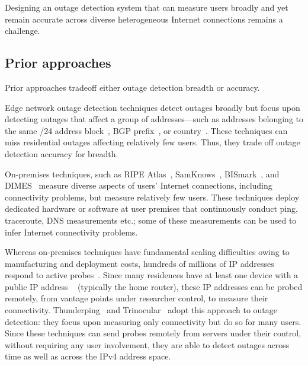Designing an outage detection system that can measure users
broadly and yet remain accurate across diverse heterogeneous
Internet connections remains a challenge.

\subsection{Prior approaches}

Prior approaches tradeoff either outage detection breadth or
accuracy. 

Edge network outage detection techniques detect outages broadly but
focus upon detecting outages that affect a group of addresses---such as
addresses belonging to the same /24 address block~\cite{trinocular, advancing-outage-art}, BGP
prefix~\cite{hubble}, or country~\cite{dainotti-imc11}. These techniques can miss residential
outages affecting relatively few users. Thus, they trade off outage detection accuracy
for breadth.

On-premises techniques, such as RIPE Atlas~\cite{atlas},
SamKnows~\cite{samknows}, BISmark~\cite{bismark-main-bib}, and
DIMES~\cite{netdimes} measure diverse aspects of users' Internet
connections, including connectivity problems, but measure relatively
few users. These techniques deploy dedicated hardware or software at
user premises that continuously conduct ping, traceroute, DNS
measurements etc.; some of these measurements can be used to infer
Internet connectivity problems.


Whereas on-premises techniques have fundamental scaling
difficulties owing to manufacturing and deployment costs, hundreds of
millions of IP addresses respond to active
probes~\cite{timeouts}. Since many residences have at least one device
with a public IP address ~\cite{cgn-imc16} (typically the home
router), these IP addresses can be probed remotely, from vantage
points under researcher control, to measure their
connectivity. Thunderping~\cite{pingin} and
Trinocular~\cite{trinocular} adopt this approach to outage detection:
they focus upon measuring only connectivity but do so for many
users. Since these techniques can send probes remotely from servers
under their control, without requiring any user involvement, they are
able to detect outages across time as well as across the IPv4 address
space.

